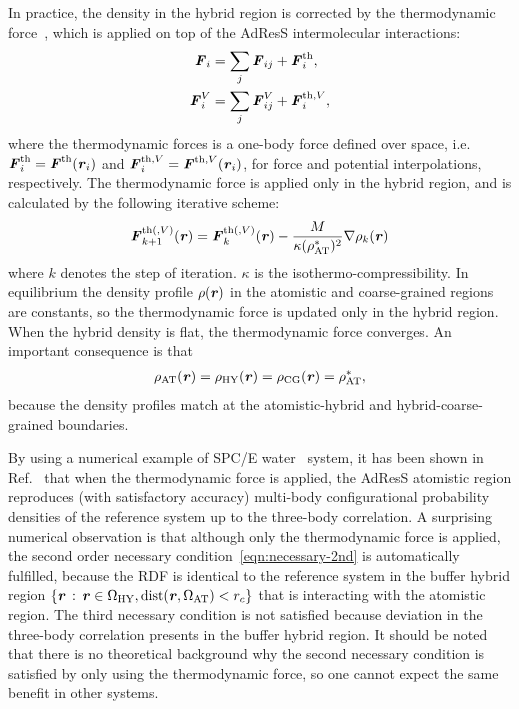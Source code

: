 \documentclass[epjST]{svjour}
\newcommand{\vect}[1]{\textbf{\textit{#1}}}
\newcommand{\dist}[0]{\textrm {dist}}
\newcommand{\AT}[0]{\textrm{AT}}
\newcommand{\HY}[0]{\textrm{HY}}
\newcommand{\CG}[0]{\textrm{CG}}
\newcommand{\moleidxone}[0]{i}
\newcommand{\moleidxtwo}[0]{j}
\newcommand{\thf}{{\textrm{th}}}
\begin{document}
In practice, the density in the hybrid region is corrected by the
thermodynamic force~\cite{fritsch2012adaptive}, which is applied on top of the AdResS intermolecular interactions:
\begin{align}\label{eqn:thf-f}
  \vect F_\moleidxone &= \sum_\moleidxtwo \vect F_{\moleidxone\moleidxtwo}  + \vect F_\moleidxone^\thf,  \\\label{eqn:thf-p}
  \vect F^V_\moleidxone& = \sum_\moleidxtwo \vect F^V_{\moleidxone\moleidxtwo} + \vect F_\moleidxone^{\thf,V},
\end{align}
where the thermodynamic forces is a one-body force defined over space,
i.e.~$\vect F^\thf_i = \vect F^\thf(\vect r_\moleidxone)$ and $\vect F^{\thf, V}_\moleidxone = \vect F^{\thf,V}(\vect r_\moleidxone)$,
for force and potential interpolations, respectively.
The thermodynamic force is applied only in the hybrid region, and is
calculated by the following iterative scheme:
\begin{align}\label{eqn:tfi}
  \vect F_{k+1}^{\thf(, V)} (\vect r) = \vect F_k^{\thf(, V)} (\vect r)-
  \frac{M}{\kappa(\rho^\ast_\AT)^2} \nabla\rho_k(\vect r)
\end{align}
where $k$ denotes the step of iteration. $\kappa$ is the
isothermo-compressibility. In equilibrium the density profile $\rho(\vect r)$ in the
atomistic and coarse-grained regions are constants, so the thermodynamic force
is updated only in the hybrid region. When the hybrid density is flat, the thermodynamic
force converges. An important consequence is that
\begin{align}
  \rho_\AT(\vect r) = \rho_\HY(\vect r) = \rho_\CG(\vect r) = \rho_\AT^\ast,
\end{align}
because the density profiles match at the atomistic-hybrid and
hybrid-coarse-grained boundaries.

By using a numerical example of SPC/E water~\cite{berendsen1987missing}
system, it has been shown in Ref.~\cite{wang2013grand} that when the
thermodynamic force is applied, the AdResS atomistic region reproduces (with satisfactory accuracy)
multi-body configurational probability densities of the reference system
up to the three-body correlation.
A surprising numerical observation is that although
only the thermodynamic force is applied, the second order necessary condition~\eqref{eqn:necessary-2nd}
is automatically fulfilled, because the RDF is identical to the reference system in the buffer hybrid region
$\{\vect r \,:\, \vect r \in\Omega_\HY, \dist(\vect r, \Omega_\AT) < r_c\}$ that is interacting with
the atomistic region. The third necessary condition is not satisfied because deviation
in the three-body correlation presents in the buffer hybrid region.
It should be noted that there is no theoretical background why the second necessary
condition is satisfied by only using the thermodynamic force,
so one cannot expect the same benefit in other systems.
\end{document}
